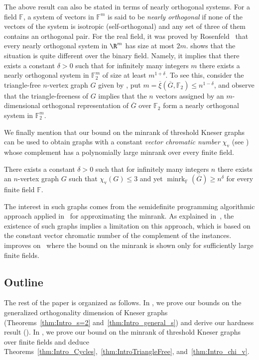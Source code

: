\documentclass{toc}
\newcommand{\Fset}{\mathbb{F}}
\newcommand{\od}{\overline{\xi}}
\newcommand{\minrank}{\mathop{\mathrm{minrk}}}
\newcommand{\vchrom}{{\chi_\mathrm{v}}}
\begin{document}
The above result can also be stated in terms of nearly orthogonal systems.
For a field $\Fset$, a system of vectors in $\Fset^m$ is said to be \emph{nearly
orthogonal} if %
%
none of the vectors of the system is isotropic (self-orthogonal) %
and any set of three of them contains an orthogonal pair.
For the real field, it was proved by Rosenfeld~\cite{Rosenfeld91} that every nearly orthogonal system in $\R^m$ has size at most $2m$.
 shows that the situation is quite different over the binary field. Namely, it implies that there exists a constant $\delta>0$ such that for infinitely many integers $m$ there exists a nearly orthogonal system in $\Fset_2^m$ of size at least $m^{1+\delta}$.
To see this, consider the triangle-free $n$-vertex graph $G$ given by , put $m = \od(\overline{G},\Fset_2) \leq n^{1-\delta}$, and observe that the triangle-freeness of $G$ implies that the $n$ vectors assigned by an $m$-dimensional orthogonal representation of $\overline{G}$ over $\Fset_2$ form a nearly orthogonal system in $\Fset_2^m$.

We finally mention that our bound on the minrank
%
%
%
of threshold Kneser graphs  %
can be used to obtain graphs with a constant \emph{vector chromatic number} $\vchrom$ (see ) whose complement has a polynomially large minrank over every finite field.
\begin{theorem}\label{thm:Intro_chi_v}
There exists a constant $\delta >0$ such that for infinitely many integers $n$ there exists an $n$-vertex graph $G$ such that $\vchrom(G) \leq 3$ and yet $\minrank_{\Fset}(\overline{G}) \geq n^\delta$ for every finite field $\Fset$.
\end{theorem}
\noindent
The interest in such graphs comes from the semidefinite programming algorithmic approach applied in~\cite{ChlamtacH14} for approximating the minrank.
%
%
As explained in~\cite{Haviv18}, %
%
the existence of such graphs implies  %
a limitation on this approach, which is based on the constant vector chromatic number of the complement of the instances.  improves on~\cite[Theorem~1.3]{Haviv18} where the bound on the minrank is shown only for sufficiently large finite fields.

\subsection{Outline}
The rest of the paper is organized as follows.
In , we prove our bounds on the generalized orthogonality dimension
%
%
of Kneser graphs (Theorems~\ref{thm:Intro_s=2} and~\ref{thm:Intro_general_s}) and derive our hardness result ().
In , we prove our bound on the minrank
%
%
of threshold Kneser graphs  %
over finite fields  %
and deduce Theorems~\ref{thm:Intro_Cycles},~\ref{thm:IntroTriangleFree}, and~\ref{thm:Intro_chi_v}.
\end{document}

